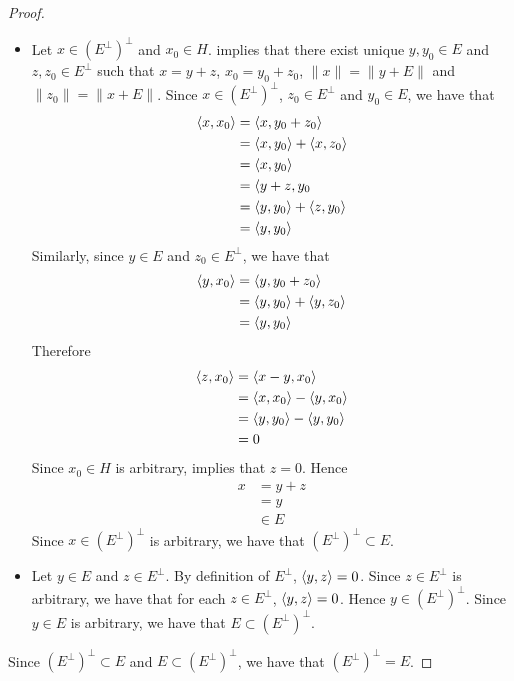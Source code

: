 \documentclass{book}
\begin{document}
\begin{proof}\
	\begin{itemize}
		\item Let $x \in (E^{\perp})^{\perp}$ and $x_0 \in H$.  implies that there exist unique $y,y_0 \in E$ and $z,z_0 \in E^{\perp}$ such that $x = y + z$, $x_0 = y_0 + z_0$, $\|x\| = \|y+E\|$ and $\|z_0\| = \|x + E\|$. Since $x \in (E^{\perp})^{\perp}$, $z_0 \in E^{\perp}$ and $y_0 \in E$, we have that
		\begin{align*}
			\langle x, x_0\rangle
			& = \langle x, y_0 + z_0 \rangle \\
			& = \langle x, y_0 \rangle + \langle x, z_0 \rangle \\
			& = \langle x, y_0 \rangle \\
			& = \langle y + z , y_0 \\
			& = \langle y, y_0 \rangle + \langle z, y_0 \rangle  \\
			& = \langle y, y_0 \rangle 
		\end{align*}
		Similarly, since $y \in E$ and $z_0 \in E^{\perp}$, we have that
		\begin{align*}
			\langle y, x_0 \rangle
			& = \langle y, y_0 + z_0\rangle \\
			& = \langle y, y_0 \rangle + \langle y, z_0 \rangle \\
			& = \langle y, y_0 \rangle    
		\end{align*}
		Therefore 
		\begin{align*}
			\langle z, x_0 \rangle
			& =  \langle x - y, x_0\rangle \\
			& = \langle x, x_0\rangle - \langle y, x_0\rangle \\
			& = \langle y, y_0 \rangle - \langle y, y_0 \rangle \\
			& = 0
		\end{align*}
		Since $x_0 \in H$ is arbitrary,  implies that $z = 0$. Hence 
		\begin{align*}
			x
			& = y + z \\
			& = y \\
			& \in E
		\end{align*}
		Since $x \in (E^{\perp})^{\perp}$ is arbitrary, we have that $(E^{\perp})^{\perp} \subset E$. 
		\item Let $y \in E$ and $z \in E^{\perp}$. By definition of $E^{\perp}$, $\langle y, z \rangle = 0$. Since $z \in E^{\perp}$ is arbitrary, we have that for each $z \in E^{\perp}$, $\langle y, z \rangle = 0$. Hence $y \in (E^{\perp})^{\perp}$. Since $y \in E$ is arbitrary, we have that $E \subset (E^{\perp})^{\perp}$. 
	\end{itemize}
	Since $(E^{\perp})^{\perp} \subset E$ and $E \subset (E^{\perp})^{\perp}$, we have that $(E^{\perp})^{\perp} = E$.
\end{proof}
\end{document}
